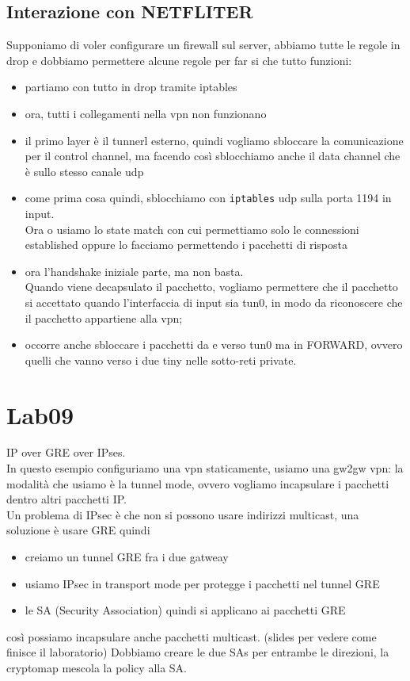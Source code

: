 \documentclass[12pt, oneside]{extbook} %
\begin{document}
\subsection{Interazione con NETFLITER}
Supponiamo di voler configurare un firewall sul server, abbiamo tutte le regole in drop e dobbiamo permettere alcune regole per far si che tutto funzioni:
\begin{itemize}
    \item partiamo con tutto in drop tramite iptables
    \item ora, tutti i collegamenti nella vpn non funzionano
    \item il primo layer è il tunnerl esterno, quindi vogliamo sbloccare la comunicazione per il control channel, ma facendo così sblocchiamo anche il data channel che è sullo stesso canale udp
    \item come prima cosa quindi, sblocchiamo con \texttt{iptables} udp sulla porta 1194 in input.
    \\Ora o usiamo lo state match con cui permettiamo solo le connessioni established oppure lo facciamo permettendo i pacchetti di risposta
    \item ora l'handshake iniziale parte, ma non basta.
    \\Quando viene decapsulato il pacchetto, vogliamo permettere che il pacchetto si accettato quando l'interfaccia di input sia tun0, in modo da riconoscere che il pacchetto appartiene alla vpn;
    \item occorre anche sbloccare i pacchetti da e verso tun0 ma in FORWARD, ovvero quelli che vanno verso i due tiny nelle sotto-reti private.
\end{itemize}

\section*{Lab09}
IP over GRE over IPses.
\\In questo esempio configuriamo una vpn staticamente, usiamo una gw2gw vpn: la modalità che usiamo è la tunnel mode, ovvero vogliamo incapsulare i pacchetti dentro altri pacchetti IP.
\\Un problema di IPsec è che non si possono usare indirizzi multicast, una soluzione è usare GRE quindi
\begin{itemize}
    \item creiamo un tunnel GRE fra i due gatweay
    \item usiamo IPsec in transport mode per protegge i pacchetti nel tunnel GRE
    \item le SA (Security Association) quindi si applicano ai pacchetti GRE
\end{itemize}
così possiamo incapsulare anche pacchetti multicast.
(slides per vedere come finisce il laboratorio)
Dobbiamo creare le due SAs per entrambe le direzioni, la cryptomap mescola la policy alla SA.
\end{document}
